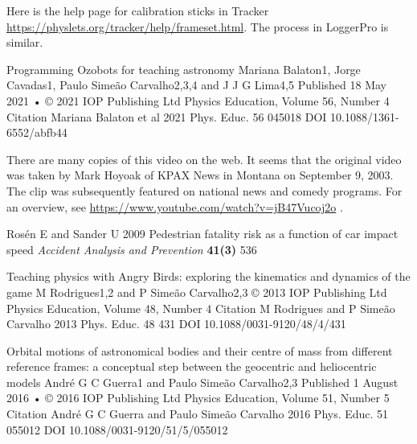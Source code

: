\documentclass[12pt]{iopart}
\begin{document}
\begin{thebibliography}{99}
 Here is the help page for calibration sticks in Tracker \url{https://physlets.org/tracker/help/frameset.html}.  The process in LoggerPro is similar.

Programming Ozobots for teaching astronomy
Mariana Balaton1, Jorge Cavadas1, Paulo Simeão Carvalho2,3,4 and J J G Lima4,5
Published 18 May 2021 • © 2021 IOP Publishing Ltd
Physics Education, Volume 56, Number 4
Citation Mariana Balaton et al 2021 Phys. Educ. 56 045018
DOI 10.1088/1361-6552/abfb44

There are many copies of this video on the web.  It seems that the original video was taken by Mark Hoyoak of KPAX News in Montana on September 9, 2003.  The clip was subsequently featured on national news and comedy programs.  For an overview, see \url{https://www.youtube.com/watch?v=jB47Vucoj2o} .
   
Rosén E and Sander U
2009
Pedestrian fatality risk as a function of car impact speed
{\it Accident Analysis and Prevention}
\textbf{41(3)} 
536

Teaching physics with Angry Birds: exploring the kinematics and dynamics of the game
M Rodrigues1,2 and P Simeão Carvalho2,3
© 2013 IOP Publishing Ltd
Physics Education, Volume 48, Number 4
Citation M Rodrigues and P Simeão Carvalho 2013 Phys. Educ. 48 431
DOI 10.1088/0031-9120/48/4/431

Orbital motions of astronomical bodies and their centre of mass from different reference frames: a conceptual step between the geocentric and heliocentric models
André G C Guerra1 and Paulo Simeão Carvalho2,3
Published 1 August 2016 • © 2016 IOP Publishing Ltd
Physics Education, Volume 51, Number 5
Citation André G C Guerra and Paulo Simeão Carvalho 2016 Phys. Educ. 51 055012
DOI 10.1088/0031-9120/51/5/055012

\end{thebibliography}
\end{document}
